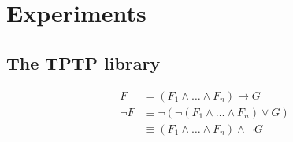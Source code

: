 \section{Experiments}

\subsection{The TPTP library}

\begin{align*}
F
&=
(F_1 \land \ldots \land F_n) \rightarrow G
\\
\lnot F
&\equiv
\lnot\left( \lnot(F_1 \land \ldots \land F_n) \lor G \right)
\\
&\equiv
(F_1 \land \ldots \land F_n) \land \lnot G
\end{align*}

